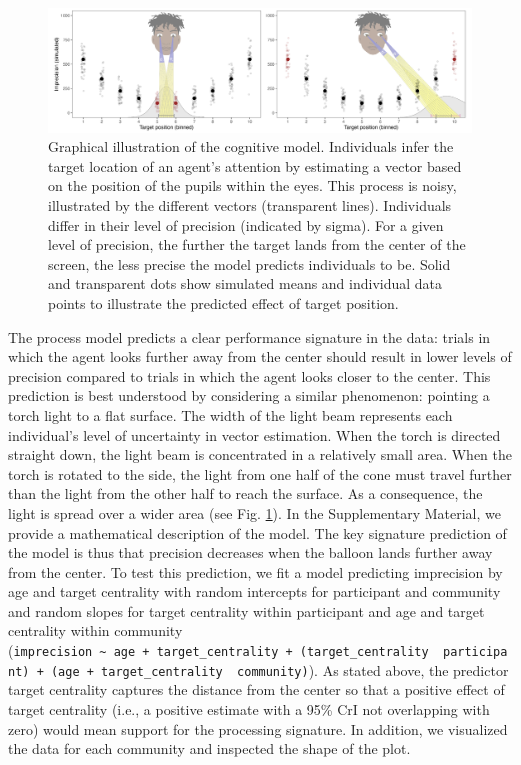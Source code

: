\documentclass[
  man,floatsintext]{apa7}
\begin{document}
\begin{figure}
\includegraphics[width=1\linewidth]{../figures/fig1_3} \caption{Graphical illustration of the cognitive model. Individuals infer the target location of an agent’s attention by estimating a vector based on the position of the pupils within the eyes. This process is noisy, illustrated by the different vectors (transparent lines). Individuals differ in their level of precision (indicated by sigma). For a given level of precision, the further the target lands from the center of the screen, the less precise the model predicts individuals to be. Solid and transparent dots show simulated means and individual data points to illustrate the predicted effect of target position.}\label{fig:fig12}
\end{figure}

The process model predicts a clear performance signature in the data: trials in which the agent looks further away from the center should result in lower levels of precision compared to trials in which the agent looks closer to the center. This prediction is best understood by considering a similar phenomenon: pointing a torch light to a flat surface. The width of the light beam represents each individual's level of uncertainty in vector estimation. When the torch is directed straight down, the light beam is concentrated in a relatively small area. When the torch is rotated to the side, the light from one half of the cone must travel further than the light from the other half to reach the surface. As a consequence, the light is spread over a wider area (see Fig. \ref{fig:fig12}). In the Supplementary Material, we provide a mathematical description of the model.
The key signature prediction of the model is thus that precision decreases when the balloon lands further away from the center. To test this prediction, we fit a model predicting imprecision by age and target centrality with random intercepts for participant and community and random slopes for target centrality within participant and age and target centrality within community (\texttt{imprecision\ \textasciitilde{}\ age\ +\ target\_centrality\ +\ (target\_centrality\ \textbar{}\ participant)\ +\ (age\ +\ target\_centrality\ \textbar{}\ community)}). As stated above, the predictor target centrality captures the distance from the center so that a positive effect of target centrality (i.e., a positive estimate with a 95\% CrI not overlapping with zero) would mean support for the processing signature. In addition, we visualized the data for each community and inspected the shape of the plot.
\end{document}
